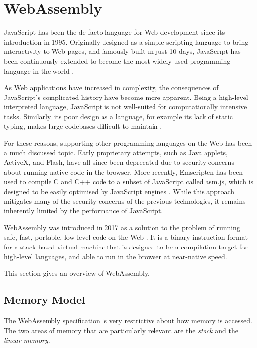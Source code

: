 \section{WebAssembly}

JavaScript has been the de facto language for Web development since its introduction in 1995. Originally designed as a simple scripting language to bring interactivity to Web pages, and famously built in just 10 days, JavaScript has been continuously extended to become the most widely used programming language in the world \cite{wirfs-brockJavaScriptfirst202020a}.

As Web applications have increased in complexity, the consequences of JavaScript's complicated history have become more apparent. Being a high-level interpreted language, JavaScript is not well-suited for computationally intensive tasks. Similarly, its poor design as a language, for example its lack of static typing, makes large codebases difficult to maintain \cite{ocarizajr.JavaScriptErrorsWild2011, biermanUnderstandingTypeScript2014}.

For these reasons, supporting other programming languages on the Web has been a much discussed topic. Early proprietary attempts, such as Java applets, ActiveX, and Flash, have all since been deprecated due to security concerns about running native code in the browser. More recently, Emscripten has been used to compile C and C++ code to a subset of JavaScript called asm.js, which is designed to be easily optimised by JavaScript engines \cite{zakaiEmscriptenLLVMtoJavaScriptcompiler2011}. While this approach mitigates many of the security concerns of the previous technologies, it remains inherently limited by the performance of JavaScript.

WebAssembly was introduced in 2017 as a solution to the problem of running safe, fast, portable, low-level code on the Web \cite{haasBringingwebspeed2017}. It is a binary instruction format for a stack-based virtual machine that is designed to be a compilation target for high-level languages, and able to run in the browser at near-native speed.

This section gives an overview of WebAssembly.

\subsection{Memory Model}

The WebAssembly specification \cite{rossbergWebAssemblyCoreSpecification2022} is very restrictive about how memory is accessed. The two areas of memory that are particularly relevant are the \emph{stack} and the \emph{linear memory}.

